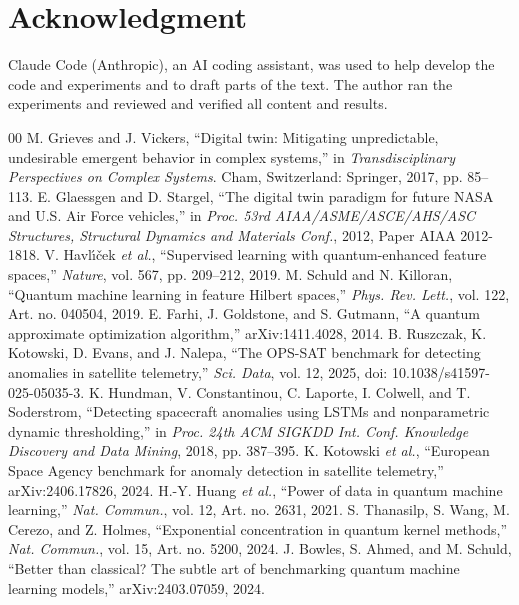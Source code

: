 \documentclass[conference]{IEEEtran}
\begin{document}
\section*{Acknowledgment}
Claude Code (Anthropic), an AI coding assistant, was used to help develop the code and
experiments and to draft parts of the text. The author ran the experiments and reviewed and
verified all content and results.

\begin{thebibliography}{00}
 M. Grieves and J. Vickers, ``Digital twin: Mitigating unpredictable,
undesirable emergent behavior in complex systems,'' in \textit{Transdisciplinary Perspectives
on Complex Systems}. Cham, Switzerland: Springer, 2017, pp. 85--113.
 E. Glaessgen and D. Stargel, ``The digital twin paradigm for future
NASA and U.S. Air Force vehicles,'' in \textit{Proc. 53rd AIAA/ASME/ASCE/AHS/ASC Structures,
Structural Dynamics and Materials Conf.}, 2012, Paper AIAA 2012-1818.
 V. Havl\'{\i}\v{c}ek \textit{et al.}, ``Supervised learning with
quantum-enhanced feature spaces,'' \textit{Nature}, vol. 567, pp. 209--212, 2019.
 M. Schuld and N. Killoran, ``Quantum machine learning in feature Hilbert
spaces,'' \textit{Phys. Rev. Lett.}, vol. 122, Art. no. 040504, 2019.
 E. Farhi, J. Goldstone, and S. Gutmann, ``A quantum approximate
optimization algorithm,'' arXiv:1411.4028, 2014.
 B. Ruszczak, K. Kotowski, D. Evans, and J. Nalepa, ``The OPS-SAT
benchmark for detecting anomalies in satellite telemetry,'' \textit{Sci. Data}, vol. 12, 2025,
doi: 10.1038/s41597-025-05035-3.
 K. Hundman, V. Constantinou, C. Laporte, I. Colwell, and T. Soderstrom,
``Detecting spacecraft anomalies using LSTMs and nonparametric dynamic thresholding,'' in
\textit{Proc. 24th ACM SIGKDD Int. Conf. Knowledge Discovery and Data Mining}, 2018,
pp. 387--395.
 K. Kotowski \textit{et al.}, ``European Space Agency benchmark for
anomaly detection in satellite telemetry,'' arXiv:2406.17826, 2024.
 H.-Y. Huang \textit{et al.}, ``Power of data in quantum machine
learning,'' \textit{Nat. Commun.}, vol. 12, Art. no. 2631, 2021.
 S. Thanasilp, S. Wang, M. Cerezo, and Z. Holmes, ``Exponential
concentration in quantum kernel methods,'' \textit{Nat. Commun.}, vol. 15, Art. no. 5200, 2024.
 J. Bowles, S. Ahmed, and M. Schuld, ``Better than classical? The subtle
art of benchmarking quantum machine learning models,'' arXiv:2403.07059, 2024.

\end{thebibliography}
\end{document}

